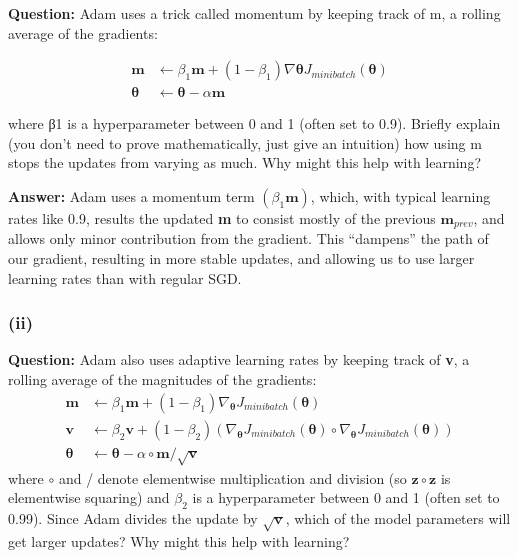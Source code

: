\documentclass[11pt]{article}
\begin{document}
\textbf{Question:} Adam uses a trick called momentum by keeping track of m, a rolling average of the gradients:

\begin{equation*}
  \begin{split}
    \mathbf{m} &\leftarrow \beta_1 \mathbf{m} + (1 - \beta_1) \nabla \bm{\theta} J_{minibatch}(\bm{\theta}) \\
    \bm{\theta} &\leftarrow \bm{\theta} - \alpha \mathbf{m}
  \end{split}
\end{equation*}

where β1 is a hyperparameter between 0 and 1 (often set to 0.9). Briefly explain (you don’t need
to prove mathematically, just give an intuition) how using m stops the updates from varying as
much. Why might this help with learning?

\textbf{Answer:} Adam uses a momentum term $(\beta_1\bm{m})$, which, with typical learning rates like 0.9, results the updated \textbf{m} to consist mostly of the previous $\mathbf{m}_{prev}$, and allows only minor contribution from the gradient. This ``dampens'' the path of our gradient, resulting in more stable updates, and allowing us to use larger learning rates than with regular SGD.

\subsubsection*{(ii)}
\textbf{Question:} Adam also uses adaptive learning rates by keeping track of \textbf{v}, a rolling average of the magnitudes of the gradients:
\begin{equation*}
  \begin{split}
    \mathbf{m} &\leftarrow \beta_1\mathbf{m} + (1 - \beta_1)\nabla_{\bm{\theta}} J_{minibatch}(\bm{\theta}) \\
    \mathbf{v} &\leftarrow \beta_2 \mathbf{v} + (1 - \beta_2)(\nabla_{\bm{\theta}}J_{minibatch}(\bm{\theta}) \circ \nabla_{\bm{\theta}}J_{minibatch}(\bm{\theta})) \\
    \bm{\theta} &\leftarrow \bm{\theta} - \alpha \circ \mathbf{m} / \sqrt{\mathbf{v}}
  \end{split}
\end{equation*}
where $\circ$ and / denote elementwise multiplication and division (so $\mathbf{z} \circ \mathbf{z}$ is elementwise squaring) and $\beta_2$ is a hyperparameter between 0 and 1 (often set to 0.99). Since Adam divides the update by $\sqrt{\mathbf{v}}$, which of the model parameters will get larger updates? Why might this help with learning?
\end{document}
